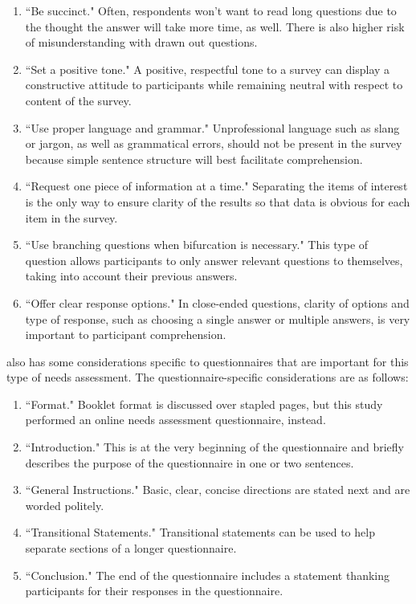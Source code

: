 \begin{enumerate}
    \item ``Be succinct."\citep{queeney} Often, respondents won't want to read long questions due to the thought the answer will take more time, as well. There is also higher risk of misunderstanding with drawn out questions. 
    \item ``Set a positive tone."\citep{queeney} A positive, respectful tone to a survey can display a constructive attitude to participants while remaining neutral with respect to content of the survey.
    \item ``Use proper language and grammar."\citep{queeney} Unprofessional language such as slang or jargon, as well as grammatical errors, should not be present in the survey because simple sentence structure will best facilitate comprehension.
    \item ``Request one piece of information at a time."\citep{queeney} Separating the items of interest is the only way to ensure clarity of the results so that data is obvious for each item in the survey.
    \item ``Use branching questions when bifurcation is necessary."\citep{queeney} This type of question allows participants to only answer relevant questions to themselves, taking into account their previous answers.
    \item ``Offer clear response options."\citep{queeney} In close-ended questions, clarity of options and type of response, such as choosing a single answer or multiple answers, is very important to participant comprehension\citep{queeney}.
\end{enumerate}
\cite{queeney} also has some considerations specific to questionnaires that are important for this type of needs assessment. The questionnaire-specific considerations are as follows:
\begin{enumerate}
    \item ``Format."\citep{queeney} Booklet format is discussed over stapled pages, but this study performed an online needs assessment questionnaire, instead.
    \item ``Introduction."\citep{queeney} This is at the very beginning of the questionnaire and briefly describes the purpose of the questionnaire in one or two sentences.
    \item ``General Instructions."\citep{queeney} Basic, clear, concise directions are stated next and are worded politely.
    \item ``Transitional Statements."\citep{queeney} Transitional statements can be used to help separate sections of a longer questionnaire.
    \item ``Conclusion."\citep{queeney} The end of the questionnaire includes a statement thanking participants for their responses in the questionnaire\citep{queeney}.
\end{enumerate}
